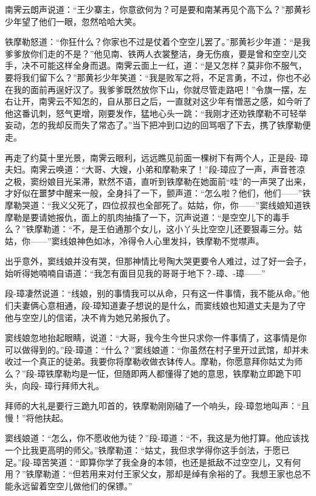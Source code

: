 \documentclass[12pt,oneside]{book}
\begin{document}
南霁云朗声说道：``王少寨主，你意欲何为？可是要和南某再见个高下么？''那黄衫少年望了他们一眼，忽然哈哈大笑。

铁摩勒怒道：``你狂什么？你家也不过是仗着个空空儿罢了。''那黄衫少年道：``是我爹爹放你们走的不是？''他见南、铁两人衣裳整洁，身无伤痕，要是曾和空空儿交手，决不可能这样全身而退。南霁云面上一红，道：``是又怎样？莫非你不服气，要将我们留下么？''那黄衫少年笑道：``我是败军之将，不足言勇，不过，你也不必在我的面前再逞好汉了。我爹爹既然放你下山，你就尽管走路吧！''令旗一摆，左右让开，南霁云不知怎的，自从那日之后，一直就对这少年有憎恶之感，如今听了他这番讥刺，怒气更增，刚要发作，猛地心头一跳：``我刚才还劝铁摩勒不可轻举妄动，怎的我却反而失了常态了。''当下把冲到口边的回骂咽了下去，携了铁摩勒便走。

再走了约莫十里光景，南霁云眼利，远远瞧见前面一棵树下有两个人，正是段-
璋夫妇。南霁云唤道：``大哥、大嫂，小弟和摩勒来了！''段-璋应了一声，声音苍凉之极，窦纷娘目光呆滞，默然不语，直听到铁摩勒在她面前``哇''的一声哭了出来，才好似在噩梦中醒来一般，全身抖了一下，颤声道：``怎么啦？他们，他们------''铁摩勒哭道：``我义父死了，四位叔叔也全部死了。姑姑，你，你------''窦线娘知道铁摩勒是要请她报仇，面上的肌肉抽搐了一下，沉声说道：``是空空儿下的毒手么？''铁摩勒道：``不，是王伯通那个女儿，这小丫头比空空儿还要狠毒三分。姑姑，你------''窦线娘神色如冰，冷得令人心里发抖，铁摩勒不觉噤声。

出乎意外，窦线娘并没有哭，但那神情比号陶大哭更要令人难过，过了好一会子，始听得她喃喃自语道：``我怎有面目见我的哥哥于地下？-璋、-璋------''

段-璋凄然说道：``线娘，别的事情我可以从命，只有这一件事情，我不能从命。''他们夫妻俩心意相通，段-璋知道妻子想说的是什么，而窦线娘也知道丈夫是为了守他与空空儿的信诺，决不肯为她兄弟报仇了。

窦线娘忽地抬起眼睛，说道：``大哥，我今生今世只求你一件事情了，这事情是你可以做得到的。''段-璋道：``什么？''窦线娘道：``你虽然在村子里开过武馆，却并未收过一个真正的徒弟。我要你将摩勒收做衣钵传人。摩勒，你愿意拜你姑丈为师么？''段-璋铁摩勒均是一怔，但随即两人都懂得了她的意思，铁摩勒立即跪下叩头，向段-
璋行拜师大礼。

拜师的大礼是要行三跪九叩首的，铁摩勒刚刚磕了一个响头，段-璋忽地叫声：``且慢！''将他扶起。

窦线娘道：``怎么，你不愿收他为徒？''段-璋道：``不，我这是为他打算。他应该找一个比我更高明的师父。''铁摩勒道：``姑丈，我但求学得你这手剑法，于愿已足。''段-璋苦笑道：``即算你学了我全身的本领，也还是抵敌不过空空儿，又有何用？''铁摩勒道：``但若用来对付王家父女，那却是绰有余裕的了。我想王家也总不能永远留着空空儿做他们的保镖。''
\end{document}

